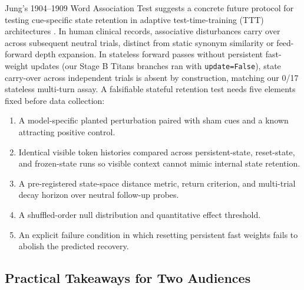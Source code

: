 \documentclass[conference]{IEEEtran}
\begin{document}
Jung's 1904--1909 Word Association Test \cite{jung1973experimental} suggests a concrete future protocol for testing cue-specific state retention in adaptive test-time-training (TTT) architectures \cite{behrouz2024titans,zhang2025lact,tandon2025ttte2e,feng2026inplace}. In human clinical records, associative disturbances carry over across subsequent neutral trials, distinct from static synonym similarity or feed-forward depth expansion. In stateless forward passes without persistent fast-weight updates (our Stage B Titans branches ran with \texttt{update=False}), state carry-over across independent trials is absent by construction, matching our 0/17 stateless multi-turn assay. A falsifiable stateful retention test needs five elements fixed before data collection:
\begin{enumerate}
  \item A model-specific planted perturbation paired with sham cues and a known attracting positive control.
  \item Identical visible token histories compared across persistent-state, reset-state, and frozen-state runs so visible context cannot mimic internal state retention.
  \item A pre-registered state-space distance metric, return criterion, and multi-trial decay horizon over neutral follow-up probes.
  \item A shuffled-order null distribution and quantitative effect threshold.
  \item An explicit failure condition in which resetting persistent fast weights fails to abolish the predicted recovery.
\end{enumerate}

\subsection{Practical Takeaways for Two Audiences}
\end{document}
